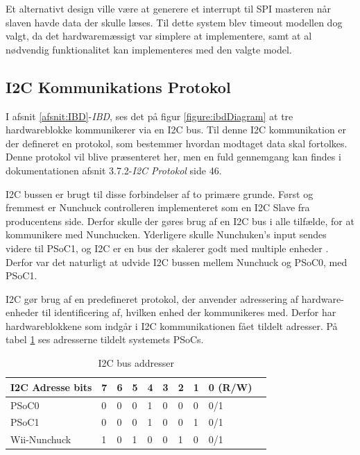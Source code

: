 \noindent Et alternativt design ville være at generere et interrupt til SPI masteren når slaven havde data der skulle læses. Til dette system blev timeout modellen dog valgt, da det hardwaremæssigt var simplere at implementere, samt at al nødvendig funktionalitet kan implementeres med den valgte model.

\subsection{I2C Kommunikations Protokol}
\label{afsnit:I2CProtokol}
I afsnit \ref{afsnit:IBD}-\textit{IBD}, ses det på figur \ref{figure:ibdDiagram} at tre hardwareblokke kommunikerer via en I2C bus. Til denne I2C kommunikation er der defineret en protokol, som bestemmer hvordan modtaget data skal fortolkes. Denne protokol vil blive præsenteret her, men en fuld gennemgang kan findes i dokumentationen afsnit 3.7.2-\textit{I2C Protokol} side 46.\newline

\noindent I2C bussen er brugt til disse forbindelser af to primære grunde. Først og fremmest er Nunchuck controlleren implementeret som en I2C Slave fra producentens side. Derfor skulle der gøres brug af en I2C bus i alle tilfælde, for at kommunikere med Nunchucken. Yderligere skulle Nunchuken's input sendes videre til PSoC1, og I2C er en bus der skalerer godt med multiple enheder \cite{i2cbus}. Derfor var det naturligt at udvide I2C bussen mellem Nunchuck og PSoC0, med PSoC1.\newline

\noindent I2C gør brug af en predefineret protokol, der anvender adressering af hardware-enheder til identificering af, hvilken enhed der kommunikeres med. Derfor har hardwareblokkene som indgår i I2C kommunikationen fået tildelt adresser. På tabel \ref{table:I2CAddress} ses adresserne tildelt systemets PSoCs.

\begin{table}[H]
	\centering
	\begin{tabular}{llllllllll}
		\hline
		\multicolumn{1}{|l|}{I2C Adresse bits} & 7                        & 6                        & 5                        & 4 & 3 & 2 & \multicolumn{1}{l|}{1} & \multicolumn{1}{l|}{0 (R/W)} \\ \hline
		\rowcolor[HTML]{CBCEFB} 
		{\color[HTML]{000000} PSoC0}           & {\color[HTML]{000000} 0} & {\color[HTML]{000000} 0} & {\color[HTML]{000000} 0} & 1 & 0 & 0 & 0                      & 0/1                          \\
		PSoC1                                  & 0                        & 0                        & 0                        & 1 & 0 & 0 & 1                      & 0/1 \\
		\rowcolor[HTML]{CBCEFB} 
		{\color[HTML]{000000} Wii-Nunchuck}           & {\color[HTML]{000000} 1} & {\color[HTML]{000000} 0} & {\color[HTML]{000000} 1} & 0 & 0 & 1 & 0                      & 0/1                      
	\end{tabular}
	\caption{I2C bus addresser}
	\label{table:I2CAddress}
\end{table}


